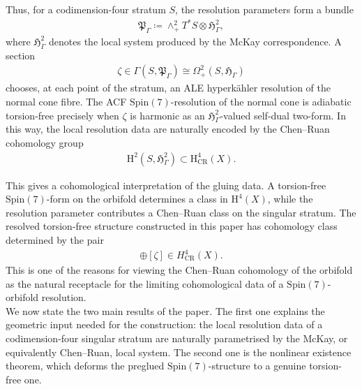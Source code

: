 \documentclass[psamsfonts]{amsart}
\theoremstyle{plain}
\theoremstyle{definition}{
\newtheorem{defi}{Definition}[section]
\newtheorem{ass}{Assumption}
\newtheorem*{nota}{Notation}}
\theoremstyle{remark}{
\newtheorem{rem}{Remark}
\newtheorem{ex}{Example}}
\theoremstyle{plain}{
\newtheorem{thm}{Theorem}[section]
\newtheorem{lem}{Lemma}[section]
\newtheorem{cor}{Corollary}[section]
\newtheorem{prop}{Proposition}[section]
\newtheorem{con}{Conjecture}[section]}
\newcommand{\m}[1]{{\mathrm{#1}}}
\begin{document}
Thus, for a codimension-four stratum $S$, the resolution parameters form a bundle
\begin{align*}
\mathfrak{P}_\Gamma\coloneqq \wedge^2_+T^*S \otimes \mathfrak{H}^2_\Gamma,
\end{align*}
where $\mathfrak{H}^2_\Gamma$ denotes the local system produced by the McKay correspondence. A section
\begin{align*}
\zeta \in \Gamma(S,\mathfrak{ P}_\Gamma)\cong \Omega^2_+(S,\mathfrak{H}_\Gamma)
\end{align*}
chooses, at each point of the stratum, an ALE hyperkähler resolution of the normal cone fibre. The ACF $\m{Spin}(7)$-resolution of the normal cone is adiabatic torsion-free precisely when $\zeta$ is harmonic as an $\mathfrak{H}^2_\Gamma$-valued self-dual two-form. In this way, the local resolution data are naturally encoded by the Chen--Ruan cohomology group
\begin{align*}
    \m{H}^2(S,\mathfrak{H}^2_\Gamma) \subset \m{H}^4_{\m{CR}}(X).
\end{align*}

This gives a cohomological interpretation of the gluing data. A torsion-free $\m{Spin}(7)$-form on the orbifold determines a class in $\m{H}^4(X)$, while the resolution parameter contributes a Chen--Ruan class  on the singular stratum. The resolved torsion-free structure constructed in this paper has cohomology class determined by the pair
\begin{align*}
    [\Phi] \oplus [\zeta] \in H^4_{\m{CR}}(X).
\end{align*}
This is one of the reasons for viewing the Chen--Ruan cohomology of the orbifold as the natural receptacle for the limiting cohomological data of a $\m{Spin}(7)$-orbifold resolution.\\

We now state the two main results of the paper. The first one explains the geometric input needed for the construction: the local resolution data of a codimension-four singular stratum are naturally parametrised by the McKay, or equivalently Chen--Ruan, local system. The second one is the nonlinear existence theorem, which deforms the preglued $\m{Spin}(7)$-structure to a genuine torsion-free one.
\end{document}
